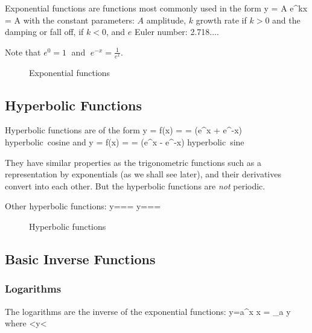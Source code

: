 Exponential functions are functions most commonly used in the form
\bnn y = A e^{kx} = A  \enn
with the constant parameters: $A$ amplitude, $k$ growth rate if $k>0$ and the damping or fall 
off, if $k<0$, and $e$ Euler number: 2.718....

Note that $e^0=1\;$ and $\;e^{-x}=\frac{1}{e^x}$. \svs

\begin{figure}[!h]
    \centerline{\epsfxsize=10cm }
    \caption{Exponential functions} \label{fig13}
\end{figure} \vs


\subsection{Hyperbolic Functions}

Hyperbolic functions are of the form
\bnn y = f(x) =  = (e^x + e^{-x}) \qquad\mbox{hyperbolic cosine} \enn
and
\bnn y = f(x) =  = (e^x - e^{-x}) \qquad\mbox{hyperbolic sine} \enn

They have similar properties as the trigonometric functions such as a representation by
exponentials (as we shall see later), and their derivatives convert into each other. 
But the hyperbolic functions are {\em not} periodic. \vs

Other hyperbolic functions:
\bnn
y=== \qquad
y===
\enn

\begin{figure}[!h]
    \centering
    \hspace*{0.5cm}
     \svs
    \caption{Hyperbolic functions} \label{fig14}
\end{figure} \vs



\subsection{Basic Inverse Functions}
\subsubsection{Logarithms}
The logarithms are the inverse of the exponential functions:
\bnn y=a^x \quad \leftrightarrow \quad x = \log_a y  \qquad\mbox{where} <y<\infty \enn

